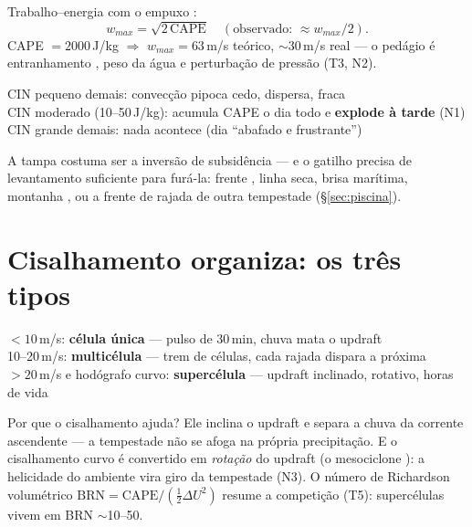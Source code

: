 \documentclass[11pt]{article}
\begin{document}
\begin{formadif}
Trabalho--energia com o empuxo :
\[ w_{max} = \sqrt{2\,\mathrm{CAPE}}
\quad(\text{observado: } \approx w_{max}/2). \]
CAPE $= 2000$\,J/kg $\Rightarrow$ $w_{max} = 63$\,m/s teórico,
$\sim$30\,m/s real — o pedágio é entranhamento , peso da água  e perturbação de
pressão (T3, N2).
\end{formadif}

\begin{noquadro}
CIN pequeno demais: convecção pipoca cedo, dispersa, fraca\\
CIN moderado (10--50\,J/kg): acumula CAPE o dia todo e \textbf{explode
à tarde} (N1)\\
CIN grande demais: nada acontece (dia ``abafado e frustrante'')
\end{noquadro}

A tampa costuma ser a inversão de subsidência
 — e o gatilho precisa de levantamento
suficiente para furá-la: frente ,
linha seca, brisa marítima, montanha , ou a frente de rajada de outra tempestade
(\S\ref{sec:piscina}).

\section{Cisalhamento organiza: os três tipos}\label{sec:tipos}


\begin{noquadro}
$<10$\,m/s: \textbf{célula única} — pulso de 30\,min, chuva mata o
updraft\\
10--20\,m/s: \textbf{multicélula} — trem de células, cada rajada
dispara a próxima\\
$>20$\,m/s e hodógrafo curvo: \textbf{supercélula} — updraft
inclinado, rotativo, horas de vida
\end{noquadro}

Por que o cisalhamento ajuda? Ele inclina o updraft e separa a chuva
da corrente ascendente — a tempestade não se afoga na própria
precipitação. E o cisalhamento curvo é convertido em \emph{rotação} do
updraft (o mesociclone ): a helicidade do
ambiente vira giro da tempestade (N3). O número de Richardson
volumétrico $\mathrm{BRN} = \mathrm{CAPE}/(\tfrac12\Delta U^2)$
resume a competição (T5): supercélulas vivem em BRN $\sim$10--50.
\end{document}
